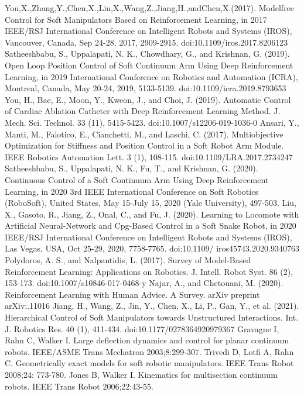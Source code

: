 \documentclass[12pt,twoside,a4]{mwbk}
\begin{document}
\begin{thebibliography}{9}
 You,X.,Zhang,Y.,Chen,X.,Liu,X.,Wang,Z.,Jiang,H.,andChen,X.(2017). Modelfree Control for Soft Manipulators Based on Reinforcement Learning, in 2017 IEEE/RSJ International Conference on Intelligent Robots and Systems (IROS), Vancouver, Canada, Sep 24-28, 2017, 2909-2915. doi:10.1109/iros.2017.8206123
 Satheeshbabu, S., Uppalapati, N. K., Chowdhary, G., and Krishnan, G. (2019). Open Loop Position Control of Soft Continuum Arm Using Deep Reinforcement Learning, in 2019 International Conference on Robotics and Automation (ICRA), Montreal, Canada, May 20-24, 2019, 5133-5139. doi:10.1109/icra.2019.8793653
 You, H., Bae, E., Moon, Y., Kweon, J., and Choi, J. (2019). Automatic Control of Cardiac Ablation Catheter with Deep Reinforcement Learning Method. J. Mech. Sci. Technol. 33 (11), 5415-5423. doi:10.1007/s12206-019-1036-0
 Ansari, Y., Manti, M., Falotico, E., Cianchetti, M., and Laschi, C. (2017). Multiobjective Optimization for Stiffness and Position Control in a Soft Robot Arm Module. IEEE Robotics Automation Lett. 3 (1), 108-115. doi:10.1109/LRA.2017.2734247
 Satheeshbabu, S., Uppalapati, N. K., Fu, T., and Krishnan, G. (2020). Continuous Control of a Soft Continuum Arm Using Deep Reinforcement Learning, in 2020 3rd IEEE International Conference on Soft Robotics (RoboSoft), United States, May 15-July 15, 2020 (Yale University), 497-503.
 Liu, X., Gasoto, R., Jiang, Z., Onal, C., and Fu, J. (2020). Learning to Locomote with Artificial Neural-Network and Cpg-Based Control in a Soft Snake Robot, in 2020 IEEE/RSJ International Conference on Intelligent Robots and Systems (IROS), Las Vegas, USA, Oct 25-29, 2020, 7758-7765. doi:10.1109/ iros45743.2020.9340763
 Polydoros, A. S., and Nalpantidis, L. (2017). Survey of Model-Based Reinforcement Learning: Applications on Robotics. J. Intell. Robot Syst. 86 (2), 153-173. doi:10.1007/s10846-017-0468-y
 Najar, A., and Chetouani, M. (2020). Reinforcement Learning with Human Advice. A Survey. arXiv preprint arXiv:.11016
 Jiang, H., Wang, Z., Jin, Y., Chen, X., Li, P., Gan, Y., et al. (2021). Hierarchical Control of Soft Manipulators towards Unstructured Interactions. Int. J. Robotics Res. 40 (1), 411-434. doi:10.1177/0278364920979367
 Gravagne I, Rahn C, Walker I. Large deflection dynamics and control for planar continuum robots. IEEE/ASME Trans Mechatron 2003;8:299-307.
 Trivedi D, Lotfi A, Rahn C. Geometrically exact models for soft robotic manipulators. IEEE Trans Robot 2008;24: 773-780.
 Jones B, Walker I. Kinematics for multisection continuum robots. IEEE Trans Robot 2006;22:43-55.

\end{thebibliography}
\end{document}
